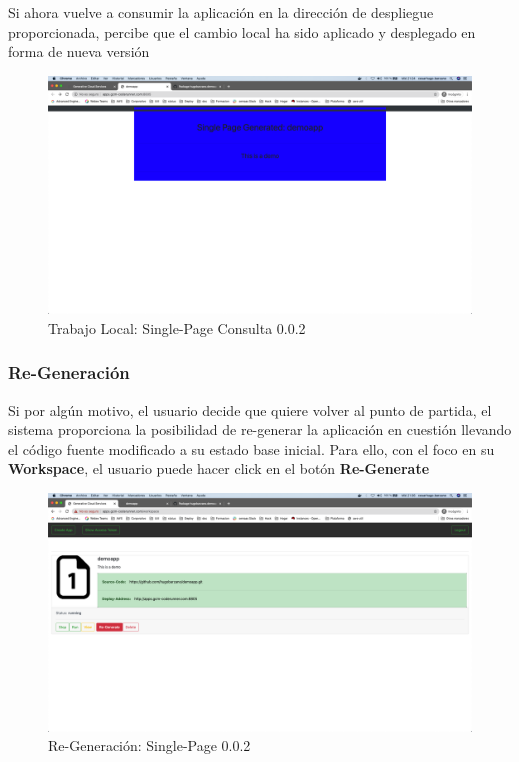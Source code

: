 \documentclass[a4paper,11pt]{book}
\begin{document}
 Si ahora vuelve a consumir la aplicación en la dirección de despliegue proporcionada, percibe que el cambio local ha sido aplicado y desplegado en forma de nueva versión
 
 
   \begin{figure}[H]
\centering
\includegraphics[scale=0.2]{imagenes/casouso/3_11.png}
\caption{   Trabajo Local: Single-Page Consulta 0.0.2}
\end{figure}


\subsubsection{Re-Generación}

Si por algún motivo, el usuario decide que quiere volver al punto de partida, el sistema proporciona la posibilidad de re-generar la aplicación en cuestión llevando el código fuente modificado a su estado base inicial. Para ello, con el foco en su \textbf{Workspace}, el usuario puede hacer click en el botón \textbf{Re-Generate}

   \begin{figure}[H]
\centering
\includegraphics[scale=0.2]{imagenes/casouso/4_1.png}
\caption{  Re-Generación: Single-Page 0.0.2 }
\end{figure}
\end{document}
